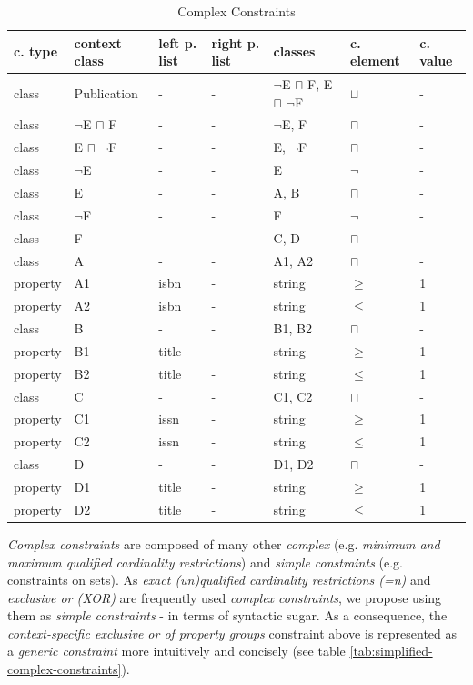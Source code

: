 \documentclass{llncs}
\begin{document}
{\begin{table}
  \scriptsize
  \sffamily
  \vspace{0cm}
	\centering
		\begin{tabular}{l|l|l|l|l|l|l}
      \textbf{c. type} & \textbf{context class} & \textbf{left p. list} & \textbf{right p. list} & \textbf{classes} & \textbf{c. element} & \textbf{c. value} \\
      \hline
class & Publication & - & - & $\neg$E $\sqcap$ F, E $\sqcap$ $\neg$F & $\sqcup$ & - \\
class & $\neg$E $\sqcap$ F & - & - & $\neg$E, F & $\sqcap$ & - \\
class & E $\sqcap$ $\neg$F & - & - & E, $\neg$F & $\sqcap$ & - \\
class & $\neg$E & - & - & E & $\neg$ & - \\
class & E & - & - & A, B & $\sqcap$ & - \\
class & $\neg$F & - & - & F & $\neg$ & - \\
class & F & - & - & C, D & $\sqcap$ & - \\
class & A & - & - & A1, A2 & $\sqcap$ & - \\
property & A1 & isbn & - & string & $\geq$ & 1 \\
property & A2 & isbn & - & string & $\leq$ & 1 \\
class & B & - & - & B1, B2 & $\sqcap$ & - \\
property & B1 & title & - & string & $\geq$ & 1 \\
property & B2 & title & - & string & $\leq$ & 1 \\
class & C & - & - & C1, C2 & $\sqcap$ & - \\
property & C1 & issn & - & string & $\geq$ & 1 \\
property & C2 & issn & - & string & $\leq$ & 1 \\
class & D & - & - & D1, D2 & $\sqcap$ & - \\
property & D1 & title & - & string & $\geq$ & 1 \\
property & D2 & title & - & string & $\leq$ & 1 \\
		\end{tabular}
	\caption{Complex Constraints}
	\label{tab:complex-constraints}
\end{table}

\emph{Complex constraints} are composed of many other \emph{complex} (e.g. \emph{minimum and maximum qualified cardinality restrictions}) and \emph{simple constraints} (e.g. constraints on sets).
As \emph{exact (un)qualified cardinality restrictions (=n)} and \emph{exclusive or (XOR)} are frequently used \emph{complex constraints},
we propose using them as \emph{simple constraints} - in terms of syntactic sugar.
As a consequence, the \emph{context-specific exclusive or of property groups} constraint above is represented as a \emph{generic constraint} more intuitively and concisely (see table \ref{tab:simplified-complex-constraints}).

}
\end{document}
